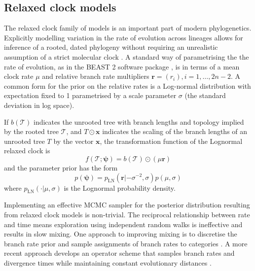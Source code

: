 \documentclass{article}
\begin{document}
\subsection*{Relaxed clock models}

The relaxed clock family of models is an important part of modern phylogenetics. Explicitly modelling variation in the rate of evolution across lineages allows for inference of a rooted, dated phylogeny without requiring an unrealistic assumption of a strict molecular clock \cite{drummond2006relaxed}. A standard way of parametrising the the rate of evolution, as in the BEAST 2 software package \cite{bouckaert2019beast}, is in terms of a mean clock rate $\mu$ and relative branch rate multipliers $\mathbf{r}=(r_i), i=1,\dots,2n-2$. A common form for the prior on the relative rates is a Log-normal distribution with expectation fixed to 1 parametrised by a scale parameter $\sigma$ (the standard deviation in log space).


If $b(\mathcal{T})$ indicates the unrooted tree with branch lengths and topology implied by the rooted tree $\mathcal{T}$, and $T \odot \mathbf{x}$ indicates the scaling of the branch lengths of an unrooted tree $T$ by the vector $\mathbf{x}$, the transformation function of the Lognormal relaxed clock is
\begin{equation*}
f(\mathcal{T}; \bm{\psi}) = b(\mathcal{T}) \odot (\mu\mathbf{r})
\end{equation*}
and the parameter prior has the form
\begin{equation*}
p(\bm{\psi}) = p_{\textrm{LN}}(\mathbf{r}|-\sigma^{-2}, \sigma)p(\mu, \sigma)
\end{equation*}
where $p_{\textrm{LN}}(\cdot|\mu, \sigma)$ is the Lognormal probability density.

Implementing an effective MCMC sampler for the posterior distribution resulting from relaxed clock models is non-trivial. The reciprocal relationship between rate and time means exploration using independent random walks is ineffective and results in slow mixing. One approach to improving mixing is to discretise the branch rate prior and sample assignments of branch rates to categories \cite{drummond2006relaxed}. A more recent approach develops an operator scheme that samples branch rates and divergence times while maintaining constant evolutionary distances \cite{zhang2020improving}.

\end{document}

